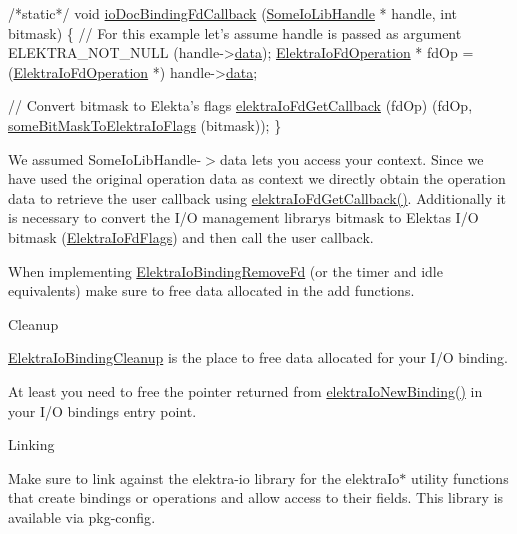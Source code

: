 \begin{DoxyCodeInclude}
\textcolor{comment}{/*static*/} \textcolor{keywordtype}{void} \hyperlink{io__doc_8c_a1fce91400d38bed917cdb6dfc1bc1cf6}{ioDocBindingFdCallback} (\hyperlink{structSomeIoLibHandle}{SomeIoLibHandle} * handle, \textcolor{keywordtype}{int} 
      bitmask)
\{
        \textcolor{comment}{// For this example let's assume handle is passed as argument}
        ELEKTRA\_NOT\_NULL (handle->\hyperlink{structSomeIoLibHandle_a3268457567f3ec3094c96c4bdf8424e5}{data});
        \hyperlink{kdbio_8h_af7fbb1df168155ef4bf0b8cd2dd1b0ff}{ElektraIoFdOperation} * fdOp = (\hyperlink{kdbio_8h_af7fbb1df168155ef4bf0b8cd2dd1b0ff}{ElektraIoFdOperation} *)
      handle->\hyperlink{structSomeIoLibHandle_a3268457567f3ec3094c96c4bdf8424e5}{data};

        \textcolor{comment}{// Convert bitmask to Elekta's flags}
        \hyperlink{io_8c_a885381fdd55cf957af1d65db7522899a}{elektraIoFdGetCallback} (fdOp) (fdOp, 
      \hyperlink{io__doc_8c_a3765fc3222ed7bd10910575f3fa700be}{someBitMaskToElektraIoFlags} (bitmask));
\}
\end{DoxyCodeInclude}
 We assumed {\ttfamily Some\+Io\+Lib\+Handle-\/$>$data} let\textquotesingle{}s you access your context. Since we have used the original operation data as context we directly obtain the operation data to retrieve the user callback using \hyperlink{io_8c_a885381fdd55cf957af1d65db7522899a}{elektra\+Io\+Fd\+Get\+Callback()}. Additionally it is necessary to convert the I/O management library\textquotesingle{}s bitmask to Elekta\textquotesingle{}s I/O bitmask (\hyperlink{kdbio_8h_ac46f42188abb1fa28c3116b8cb755825}{Elektra\+Io\+Fd\+Flags}) and then call the user callback.

When implementing \hyperlink{kdbio_8h_af1d03ff367130892ec3d1f4788eb8277}{Elektra\+Io\+Binding\+Remove\+Fd} (or the timer and idle equivalents) make sure to free data allocated in the add functions.

\begin{DoxyParagraph}{Cleanup}

\end{DoxyParagraph}
\hyperlink{kdbio_8h_a08d3ce531bbd1c5acedbdb9822b24d6d}{Elektra\+Io\+Binding\+Cleanup} is the place to free data allocated for your I/O binding.

At least you need to free the pointer returned from \hyperlink{io_8c_a8dd14e7bd04afb798ea30ff8feb5f3a6}{elektra\+Io\+New\+Binding()} in your I/O binding\textquotesingle{}s entry point.

\begin{DoxyParagraph}{Linking}

\end{DoxyParagraph}
Make sure to link against the {\ttfamily elektra-\/io} library for the {\ttfamily elektra\+Io$\ast$} utility functions that create bindings or operations and allow access to their fields. This library is available via {\ttfamily pkg-\/config}.


